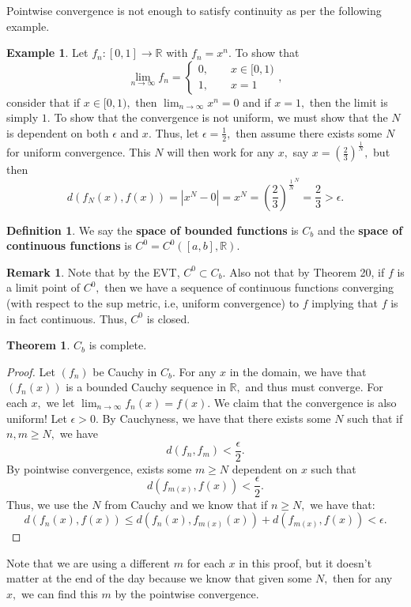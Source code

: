 \documentclass[10pt, oneside]{article}
\newcommand{\bbR}{\mathbb{R}}
\theoremstyle{definition}
\newtheorem{exmp}{Example}[section]
\newtheorem{thm}{Theorem}
\newtheorem{defn}{Definition}
\newtheorem{rem}{Remark}
\begin{document}
Pointwise convergence is not enough to satisfy continuity as per the following example.
\begin{exmp}
    Let $f_n: [0,1]\to \bbR$ with $f_n = x^n.$ To show that \[\lim_{n\to \infty} f_n = \begin{cases}
        0, \qquad x\in [0,1)\\
        1, \qquad x = 1
    \end{cases},\] consider that if $x\in [0,1),$ then $\lim_{n\to \infty}x^n = 0$ and if $x=1,$ then the limit is simply $1.$ To show that the convergence is not uniform, we must show that the $N$ is dependent on both $\epsilon$ and $x.$ Thus, let $\epsilon = \frac{1}{2},$ then assume there exists some $N$ for uniform convergence. This $N$ will then work for any $x,$ say $x = (\frac{2}{3})^{\frac{1}{N}},$ but then
    \[d(f_N(x), f(x)) = |x^N - 0| = x^N = (\frac{2}{3})^{\frac{1}{N}^N} = \frac{2}{3} >\epsilon.\]
\end{exmp}
\begin{defn}
    We say the \textbf{space of bounded functions} is $C_b$ and the \textbf{space of continuous functions} is $C^0 = C^0([a,b], \bbR).$
\end{defn}
\begin{rem}
    Note that by the EVT, $C^0 \subset C_b.$ Also not that by Theorem 20, if $f$ is a limit point of $C^0,$ then we have a sequence of continuous functions converging (with respect to the sup metric, i.e, uniform convergence) to $f$ implying that $f$ is in fact continuous. Thus, $C^0$ is closed.
    \end{rem}
\begin{thm}
    $C_b$ is complete.
\end{thm}
\begin{proof}
    Let $(f_n)$ be Cauchy in $C_b.$ For any $x$ in the domain, we have that $(f_n(x))$ is a bounded Cauchy sequence in $\bbR,$ and thus must converge. For each $x,$ we let $\lim_{n\to \infty}f_n(x) = f(x).$ We claim that the convergence is also uniform! Let $\epsilon>0.$ By Cauchyness, we have that there exists some $N$ such that if $n,m \geq N,$ we have 
    \[d(f_n, f_m)< \frac{\epsilon}{2}.\] By pointwise convergence, exists some $m\geq N$ dependent on $x$ such that 
    \[d(f_{m(x)}, f(x))< \frac{\epsilon}{2}.\] Thus, we use the $N$ from Cauchy and we know that if $n\geq N,$ we have that:
    \[d(f_n(x), f(x)) \leq d(f_n(x), f_{m(x)}(x)) + d(f_{m(x)}, f(x))< \epsilon.\]
\end{proof}
Note that we are using a different $m$ for each $x$ in this proof, but it doesn't matter at the end of the day because we know that given some $N,$ then for any $x,$ we can find this $m$ by the pointwise convergence.
\end{document}
